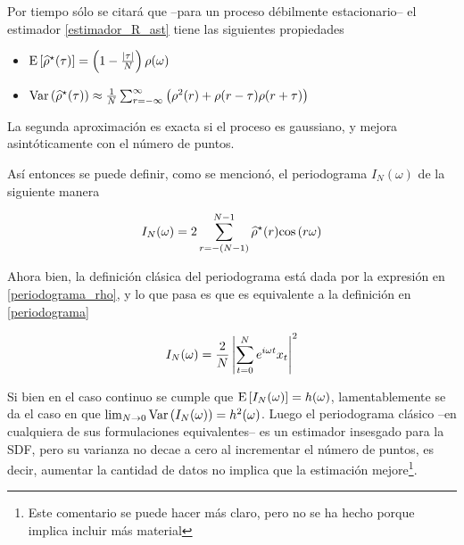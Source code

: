 Por tiempo s\'olo se citar\'a que --para un proceso d\'ebilmente estacionario-- el
estimador \ref{estimador_R_ast} tiene las siguientes propiedades
\begin{itemize}
\item $\mathrm{E}\left[ \widehat{ \rho }^{\star}(\tau) \right] = \left(1 - \frac{\left| \tau \right|}{N} \right) \rho(\omega)$
\item $\mathrm{Var}\left( \widehat{ \rho }^{\star}(\tau) \right) \approx \frac{1}{N} 
\sum_{r=-\infty}^{\infty} \left( \rho^{2}(r) + \rho(r-\tau)\rho(r+\tau) \right)$
\end{itemize}
La segunda aproximaci\'on es exacta si el proceso es gaussiano, y mejora asint\'oticamente
con el n\'umero de puntos.

As\'i entonces se puede definir, como se mencion\'o, 
el periodograma $I_N(\omega)$ de la siguiente manera

\begin{equation}
I_N(\omega) = 2 \sum_{r = -(N-1)}^{N-1} \widehat{ \rho }^{\star}(r) \mathrm{cos}\left( r \omega \right)
\label{periodograma_rho}
\end{equation}

Ahora bien, la definici\'on cl\'asica del periodograma est\'a dada por la expresi\'on
en \ref{periodograma_rho}, y lo que pasa es que es equivalente a la definici\'on
en \ref{periodograma}

\begin{equation}
I_N(\omega) = \frac{2}{N} \left|  \sum_{t=0}^{N} e^{i \omega t} x_t  \right|^{2}
\label{periodograma}
\end{equation}


Si bien en el caso continuo se cumple que $\mathrm{E}\left[ I_N(\omega) \right]=h(\omega)$, lamentablemente
se da el caso en que $\lim_{N\rightarrow 0} \mathrm{Var}\left( I_N(\omega) \right) = h^{2}(\omega)$. Luego el
periodograma cl\'asico --en cualquiera de sus formulaciones equivalentes-- es un estimador
insesgado para la SDF, pero su varianza no decae a cero al incrementar el n\'umero de puntos, es
decir, aumentar la cantidad de datos no implica que la estimaci\'on mejore\footnote{Este 
comentario se puede hacer m\'as claro, pero no se ha hecho porque implica incluir m\'as material}.

